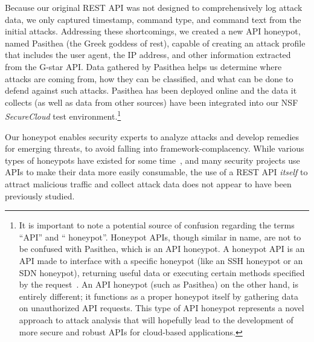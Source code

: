 Because our original REST API was not designed to comprehensively log attack data, we only captured timestamp, command type, and command text from the initial attacks.  
Addressing these shortcomings, we created a new API honeypot, named Pasithea (the Greek goddess of rest), capable of creating an attack profile that includes the user agent, the IP address, and other information extracted from the G-star API.
Data gathered by Pasithea helps us determine where attacks are coming from, how they can be classified, and what can be done to defend against such attacks.  
Pasithea has been deployed online and the data it collects (as well as data from other sources) have been integrated into our NSF {\em SecureCloud} test environment.\footnote{  
It is important to note a potential source of confusion regarding the terms ``API'' and `` honeypot''. 
Honeypot APIs, though similar in name, are not to be confused with Pasithea, which is an API honeypot. 
A honeypot API is an API made to interface with a specific honeypot (like an SSH honeypot or an SDN honeypot), returning useful data or executing certain methods specified by the request~\cite{Honeypot-API}. 
An API honeypot (such as Pasithea) on the other hand, is entirely different; it functions as a proper honeypot itself by gathering data on unauthorized API requests.  
This type of API honeypot represents a novel approach to attack analysis that will hopefully lead to the development of more secure and robust APIs for cloud-based applications.}  

Our honeypot enables security experts to analyze attacks and develop remedies for emerging threats, to avoid falling into framework-complacency.  
While various types of honeypots have existed for some time~\cite{Stoll:1989:CET:67554,Provos:2004:VHF:1251375.1251376}, and many security projects use APIs to make their data more easily consumable,
the use of a REST API {\em itself} to attract malicious traffic and collect attack data does not appear to have been previously studied.

